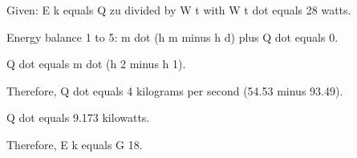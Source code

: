 Given: E k equals Q zu divided by W t with W t dot equals 28 watts.

Energy balance 1 to 5: m dot (h m minus h d) plus Q dot equals 0.

Q dot equals m dot (h 2 minus h 1).

Therefore, Q dot equals 4 kilograms per second (54.53 minus 93.49).

Q dot equals 9.173 kilowatts.

Therefore, E k equals G 18.